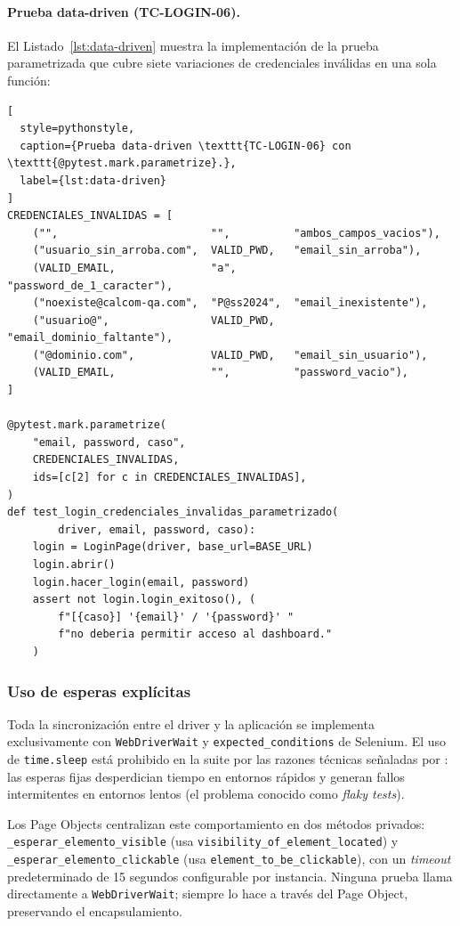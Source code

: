 \documentclass{article}
\begin{document}
\paragraph{Prueba data-driven (TC-LOGIN-06).}
El Listado~\ref{lst:data-driven} muestra la implementación de la prueba
parametrizada que cubre siete variaciones de credenciales inválidas en una
sola función:

\begin{lstlisting}[
  style=pythonstyle,
  caption={Prueba data-driven \texttt{TC-LOGIN-06} con \texttt{@pytest.mark.parametrize}.},
  label={lst:data-driven}
]
CREDENCIALES_INVALIDAS = [
    ("",                        "",          "ambos_campos_vacios"),
    ("usuario_sin_arroba.com",  VALID_PWD,   "email_sin_arroba"),
    (VALID_EMAIL,               "a",         "password_de_1_caracter"),
    ("noexiste@calcom-qa.com",  "P@ss2024",  "email_inexistente"),
    ("usuario@",                VALID_PWD,   "email_dominio_faltante"),
    ("@dominio.com",            VALID_PWD,   "email_sin_usuario"),
    (VALID_EMAIL,               "",          "password_vacio"),
]

@pytest.mark.parametrize(
    "email, password, caso",
    CREDENCIALES_INVALIDAS,
    ids=[c[2] for c in CREDENCIALES_INVALIDAS],
)
def test_login_credenciales_invalidas_parametrizado(
        driver, email, password, caso):
    login = LoginPage(driver, base_url=BASE_URL)
    login.abrir()
    login.hacer_login(email, password)
    assert not login.login_exitoso(), (
        f"[{caso}] '{email}' / '{password}' "
        f"no deberia permitir acceso al dashboard."
    )
\end{lstlisting}

\subsubsection{Uso de esperas explícitas}

Toda la sincronización entre el driver y la aplicación se implementa
exclusivamente con \texttt{WebDriverWait} y \texttt{expected\_conditions}
de Selenium. El uso de \texttt{time.sleep} está prohibido en la suite
por las razones técnicas señaladas por \textcite{Garcia2022}: las esperas
fijas desperdician tiempo en entornos rápidos y generan fallos intermitentes
en entornos lentos (el problema conocido como \textit{flaky tests}).

Los Page Objects centralizan este comportamiento en dos métodos privados:
\texttt{\_esperar\_elemento\_visible} (usa \texttt{visibility\_of\_element\_located})
y \texttt{\_esperar\_elemento\_clickable} (usa \texttt{element\_to\_be\_clickable}),
con un \textit{timeout} predeterminado de 15 segundos configurable por
instancia. Ninguna prueba llama directamente a \texttt{WebDriverWait};
siempre lo hace a través del Page Object, preservando el encapsulamiento.
\end{document}
